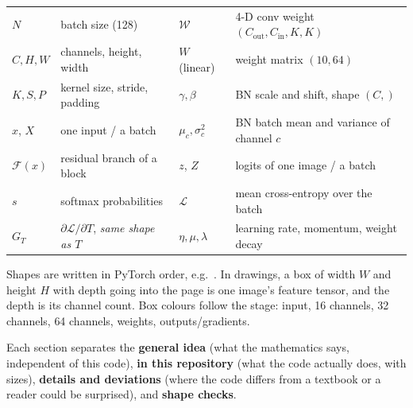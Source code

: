 \begin{center}
\small
\begin{tabular}{@{}ll@{\qquad}ll@{}}
\toprule
$N$ & batch size (128) & $\mathcal W$ & 4-D conv weight $(C_\text{out},C_\text{in},K,K)$\\
$C,H,W$ & channels, height, width & $W$ (linear) & weight matrix $(10,64)$\\
$K,S,P$ & kernel size, stride, padding & $\gamma,\beta$ & BN scale and shift, shape $(C,)$\\
$x$, $X$ & one input / a batch & $\mu_c,\sigma_c^2$ & BN batch mean and variance of channel $c$\\
$\mathcal F(x)$ & residual branch of a block & $z$, $Z$ & logits of one image / a batch\\
$s$ & softmax probabilities & $\mathcal L$ & mean cross-entropy over the batch\\
$G_T$ & $\partial\mathcal L/\partial T$, \emph{same shape as $T$} & $\eta,\mu,\lambda$ & learning rate, momentum, weight decay\\
\bottomrule
\end{tabular}
\end{center}

Shapes are written in PyTorch order, e.g.\ . In drawings, a box of width $W$ and height $H$ with depth going into the page is one image's feature tensor, and the depth is its channel count. Box colours follow the stage: \colorbox{cIn}{input}, \colorbox{c16}{16 channels}, \colorbox{c32}{32 channels}, \colorbox{c64}{64 channels}, \colorbox{cK}{weights}, \colorbox{cG}{outputs/gradients}.

Each section separates the \textcolor{idea}{\textbf{general idea}} (what the mathematics says, independent of this code), \textcolor{repo}{\textbf{in this repository}} (what the code actually does, with sizes), \textcolor{warn}{\textbf{details and deviations}} (where the code differs from a textbook or a reader could be surprised), and \textcolor{shapec}{\textbf{shape checks}}.
